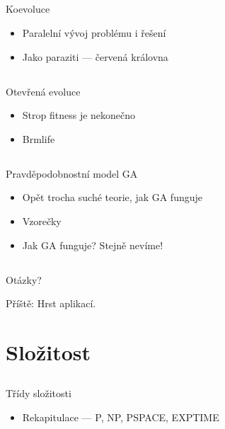 \documentclass{beamer}
\begin{document}
\subsection{}
\begin{frame}{Koevoluce}
\begin{itemize}
\item Paralelní vývoj problému i řešení
\item Jako paraziti --- červená královna
\end{itemize}
\end{frame}

\subsection{}
\begin{frame}{Otevřená evoluce}
\begin{itemize}
\item Strop fitness je nekonečno
\item Brmlife
\end{itemize}
\end{frame}

\subsection{}
\begin{frame}{Pravděpodobnostní model GA}
\begin{itemize}
\item Opět trocha suché teorie, jak GA funguje
\item Vzorečky
\item Jak GA funguje? Stejně nevíme!
\end{itemize}
\end{frame}

\subsection{}
\begin{frame}{Otázky?}
\begin{center}
Příště: Hrst aplikací.
\end{center}
\end{frame}

\section{Složitost}

\subsection{}
\begin{frame}{Třídy složitosti}
\begin{itemize}
\item Rekapitulace --- P, NP, PSPACE, EXPTIME
\end{itemize}
\end{frame}
\end{document}
